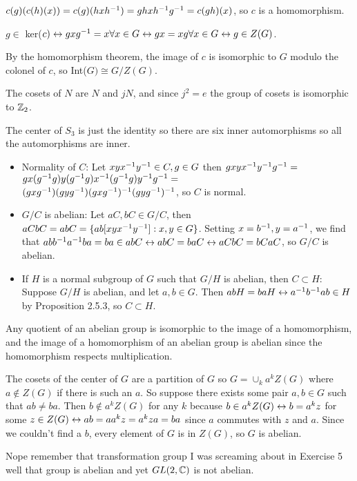 \documentclass[11pt, oneside]{article}   	%
\begin{document}
\item $c(g)(c(h)(x)) = c(g)(hxh^{-1}) = ghxh^{-1} g^{-1} = c(gh)(x)$, so $c$ is a homomorphism.
\item $g \in$ ker($c) \leftrightarrow gxg^{-1} = x \forall x \in G \leftrightarrow gx = xg \forall x \in G \leftrightarrow g \in Z(G)$. 
\item By the homomorphism theorem, the image of $c$ is isomorphic to $G$ modulo the colonel of $c$, so Int($G) \cong G/Z(G)$.
\ee
\item The cosets of $N$ are $N$ and $jN$, and since $j^2 = e$ the group of cosets is isomorphic to $\mathbb{Z}_2$.
\item The center of $S_3$ is just the identity so there are six inner automorphisms so all the automorphisms are inner. 
\item \begin{itemize}
\item Normality of $C$: Let $xyx^{-1} y^{-1} \in C, g \in G$ then $gxyx^{-1} y^{-1} g^{-1} = $\\$ gx (g^{-1} g) y (g^{-1} g) x^{-1} (g^{-1} g) y^{-1}  g^{-1} = $\\$(gxg^{-1})(gyg^{-1})(gxg^{-1})^{-1}(gyg^{-1})^{-1}$, so $C$ is normal.
\item $G/C$ is abelian: Let $aC, bC \in G/C$, then $aCbC = abC = \{ab[xyx^{-1} y^{-1}]:x, y \in G\}$. Setting $x=b^{-1}, y = a^{-1}$, we find that $abb^{-1} a^{-1} ba = ba \in abC \leftrightarrow abC = baC \leftrightarrow aCbC = bCaC$, so $G/C$ is abelian.
\item If $H$ is a normal subgroup of $G$ such that $G/H$ is abelian, then $C \subset H$: Suppose $G/H$ is abelian, and let $a, b \in G$. Then $abH = baH \leftrightarrow a^{-1} b^{-1} ab \in H$ by Proposition 2.5.3, so $C \subset H$.
\end{itemize}
\item Any quotient of an abelian group is isomorphic to the image of a homomorphism, and the image of a homomorphism of an abelian group is abelian since the homomorphism respects multiplication.
\item The cosets of the center of $G$ are a partition of $G$ so $G = \cup_k a^kZ(G)$ where $a \not \in Z(G)$ if there is such an $a$. So suppose there exists some pair $a, b \in G$ such that $ab \not = ba$. Then $b \not \in a^kZ(G)$ for any $k$ because $b \in a^kZ(G) \leftrightarrow b = a^kz$ for some $z \in Z(G) \leftrightarrow ab = aa^kz = a^kza = ba$ since $a$ commutes with $z$ and $a$. Since we couldn't find a $b$, every element of $G$ is in $Z(G)$, so $G$ is abelian.
\item Nope remember that transformation group I was screaming about in Exercise 5 well that group is abelian and yet $GL(2, \mathbb{C})$ is not abelian.
\ee
\end{document}
